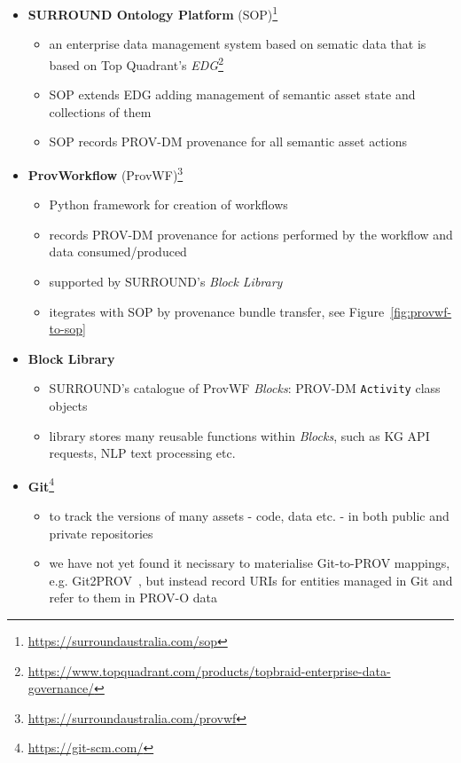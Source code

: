 \documentclass[letterpaper,twocolumn,10pt]{article}
\begin{document}
\begin{itemize}
  \item \textbf{SURROUND Ontology Platform} (SOP)\footnote{\url{https://surroundaustralia.com/sop}}
  \begin{itemize}
    \item an enterprise data management system based on sematic data that is based on Top Quadrant's \textit{EDG}\footnote{\url{https://www.topquadrant.com/products/topbraid-enterprise-data-governance/}}
    \item SOP extends EDG adding management of semantic asset state and collections of them
    \item SOP records PROV-DM provenance for all semantic asset actions
  \end{itemize}
  \item \textbf{ProvWorkflow} (ProvWF)\footnote{\url{https://surroundaustralia.com/provwf}}
  \begin{itemize}
    \item Python framework for creation of workflows
    \item records PROV-DM provenance for actions performed by the workflow and data consumed/produced
    \item supported by SURROUND's \textit{Block Library}
    \item itegrates with SOP by provenance bundle transfer, see Figure~\ref{fig:provwf-to-sop}
  \end{itemize}
  \item \textbf{Block Library}
  \begin{itemize}
    \item SURROUND's catalogue of ProvWF \textit{Blocks}: PROV-DM \texttt{Activity} class objects
    \item library stores many reusable functions within \textit{Blocks}, such as KG API requests, NLP text processing etc.
  \end{itemize}
  \item \textbf{Git}\footnote{\url{https://git-scm.com/}}
  \begin{itemize}
    \item to track the versions of many assets - code, data etc. - in both public and private repositories
    \item we have not yet found it necissary to materialise Git-to-PROV mappings, e.g. Git2PROV~\cite{tom_de_nies_git2prov_nodate}, but instead record URIs for entities managed in Git and refer to them in PROV-O data
  \end{itemize}
\end{itemize}
\end{document}
